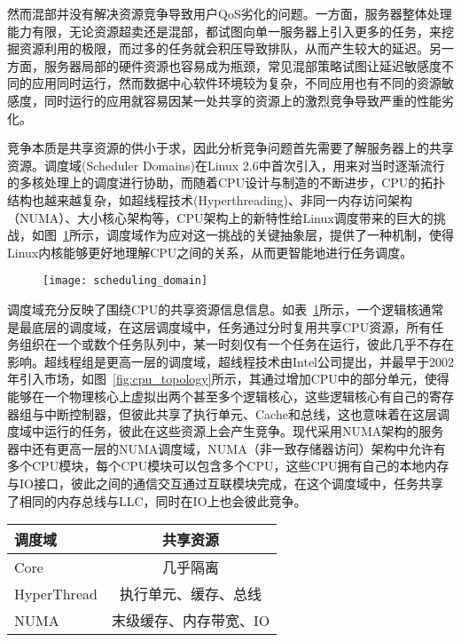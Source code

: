 然而混部并没有解决资源竞争导致用户QoS劣化的问题。一方面，服务器整体处理能力有限，无论资源超卖还是混部，都试图向单一服务器上引入更多的任务，来挖掘资源利用的极限，而过多的任务就会积压导致排队，从而产生较大的延迟。另一方面，服务器局部的硬件资源也容易成为瓶颈，常见混部策略试图让延迟敏感度不同的应用同时运行，然而数据中心软件环境较为复杂，不同应用也有不同的资源敏感度，同时运行的应用就容易因某一处共享的资源上的激烈竞争导致严重的性能劣化。

竞争本质是共享资源的供小于求，因此分析竞争问题首先需要了解服务器上的共享资源。调度域(Scheduler Domains)\citep{schedulerdomains}在Linux 2.6中首次引入，用来对当时逐渐流行的多核处理上的调度进行协助，而随着CPU设计与制造的不断进步，CPU的拓扑结构也越来越复杂，如超线程技术(Hyperthreading)、非同一内存访问架构（NUMA）、大小核心架构等，CPU架构上的新特性给Linux调度带来的巨大的挑战，如图~\ref{fig:scheduling_domain}所示，调度域作为应对这一挑战的关键抽象层，提供了一种机制，使得Linux内核能够更好地理解CPU之间的关系，从而更智能地进行任务调度。

\begin{figure}[!htbp]
    \centering
    \texttt{[image: scheduling\_domain]}
    \label{fig:scheduling_domain}
\end{figure}

调度域充分反映了围绕CPU的共享资源信息信息。如表~\ref{tab:resourcesharing}所示，一个逻辑核通常是最底层的调度域，在这层调度域中，任务通过分时复用共享CPU资源，所有任务组织在一个或数个任务队列中，某一时刻仅有一个任务在运行，彼此几乎不存在影响。超线程组是更高一层的调度域，超线程技术由Intel公司提出，并最早于2002年引入市场，如图~\ref{fig:cpu_topology}所示，其通过增加CPU中的部分单元，使得能够在一个物理核心上虚拟出两个甚至多个逻辑核心，这些逻辑核心有自己的寄存器组与中断控制器，但彼此共享了执行单元、Cache和总线，这也意味着在这层调度域中运行的任务，彼此在这些资源上会产生竞争。现代采用NUMA架构的服务器中还有更高一层的NUMA调度域，NUMA（非一致存储器访问）架构中允许有多个CPU模块，每个CPU模块可以包含多个CPU，这些CPU拥有自己的本地内存与IO接口，彼此之间的通信交互通过互联模块完成，在这个调度域中，任务共享了相同的内存总线与LLC，同时在IO上也会彼此竞争。

\begin{table}
    \label{tab:resourcesharing}
    \footnotesize%
    \setlength{\tabcolsep}{4pt}%
    \renewcommand{\arraystretch}{1.5}%
    \centering
    \begin{tabular}{lc}
        \hline
        调度域 & 共享资源\\
        \hline
        Core & 几乎隔离\\
        HyperThread & 执行单元、缓存、总线\\
        NUMA & 末级缓存、内存带宽、IO\\
        \hline
    \end{tabular}
\end{table}

